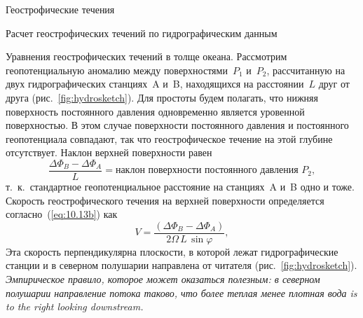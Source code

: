 \begin{chapter}{Геострофические течения}
\begin{section}{Расчет геострофических течений по гидрографическим данным}
\begin{paragraph}{Уравнения геострофических течений в толще океана.}
Рассмотрим геопотенциальную аномалию между поверхностями~$P_1$ и~$P_2$,
рассчитанную на двух гидрографических станциях~A и~B, находящихся на 
расстоянии~$L$ друг от друга (рис.~\ref{fig:hydrosketch}). 
Для простоты будем полагать, что нижняя поверхность постоянного
давления одновременно является уровенной 
поверхностью. В этом случае поверхности 
постоянного давления и постоянного геопотенциала совпадают, так что 
геострофическое течение на этой глубине отсутствует.
Наклон верхней поверхности равен
\begin{displaymath}
 \frac{\Delta\Phi_B - \Delta\Phi_A}{L} 
  =\text{наклон поверхности постоянного давления $P_2$},
\end{displaymath}
т.~к.\ стандартное геопотенциальное расстояние на станциях~A и~B одно и тоже.
Скорость геострофического течения на 
верхней поверхности определяется согласно~(\ref{eq:10.13b}) как
\begin{equation}
  V =\frac{\left(\Delta\Phi_B - \Delta\Phi_A\right)}{2\Omega\,L\, \sin\varphi},
\end{equation}
Эта скорость перпендикулярна плоскости, в которой лежат гидрографические 
станции и в северном полушарии направлена от читателя (рис.~\ref{fig:hydrosketch}). 
\emph{Эмпирическое правило, которое может оказаться полезным:
в северном полушарии направление потока таково, что более теплая менее плотная
вода is to the right looking downstream.}
%

\end{paragraph}
\end{section}
\end{chapter}
